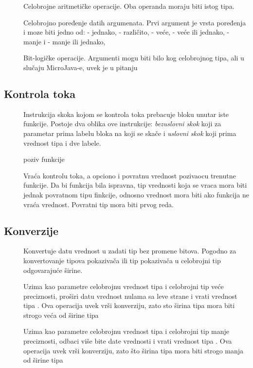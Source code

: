 \begin{description}
\item[] Celobrojne aritmetičke operacije. Oba operanda moraju biti istog tipa.
\item[] Celobrojno poređenje datih argumenata. Prvi argument je vrsta poređenja i moze biti
jedno od:  - jednako,   - različito,  - veće,  - veće ili jednako,   - manje i   - manje ili jednako, 
\item[] Bit-logičke operacije. Argumenti mogu biti bilo kog celobrojnog tipa, ali u slučaju MicroJava-e, uvek je u pitanju 
\end{description}

\subsection*{Kontrola toka}

\begin{description}
\item[] Instrukcija skoka kojom se kontrola toka prebacuje bloku unutar iste funkcije. Postoje dva oblika ove instrukcije: \textit{bezuslovni skok} koji za parametar prima labelu bloka na koji se skače i \textit{uslovni skok} koji prima vrednost tipa  i dve labele.
\item[] poziv funkcije
\item[] Vraća kontrolu toka, a opciono i povratnu vrednost pozivaocu trenutne funkcije. Da bi funkcija bila ispravna, tip vrednosti koja se vraca mora biti jednak povratnom tipu finkcije, odnosno vrednost mora biti  ako funkcija ne vraća vrednost. Povratni tip mora biti prvog reda.
\end{description}

\subsection*{Konverzije}

\begin{description}
\item[] Konvertuje datu vrednost u zadati tip bez promene bitova. Pogodno za konvertovanje tipova pokazivača ili tip pokazivača u celobrojni tip odgovarajuće širine.
\item[]
\item[] Uzima kao parametre celobrojnu vrednost tipa  i celobrojni tip  veće preciznosti, proširi datu vrednost nulama sa leve strane i vrati vrednost tipa . Ova operacija uvek vrši konverziju, zato sto širina tipa  mora biti strogo veća od širine tipa 
\item[] Uzima kao parametre celobrojnu vrednost tipa  i celobrojni tip  manje preciznosti, odbaci više bite date vrednosti i vrati vrednost tipa . Ova operacija uvek vrši konverziju, zato što širina tipa  mora biti strogo manja od širine tipa 
\end{description}
